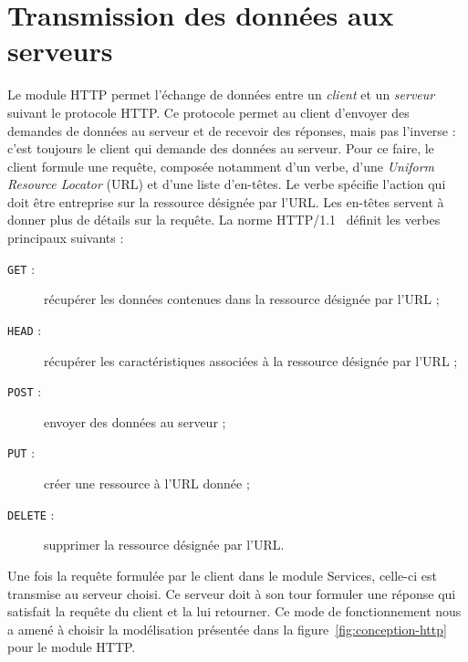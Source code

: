 \section{Transmission des données aux serveurs}

Le module HTTP permet l'échange de données entre un \emph{client} et un \emph{serveur} suivant le protocole HTTP. Ce protocole permet au client d'envoyer des demandes de données au serveur et de recevoir des réponses, mais pas l'inverse : c'est toujours le client qui demande des données au serveur. Pour ce faire, le client formule une requête, composée notamment d'un verbe, d'une \emph{Uniform Resource Locator} (URL) et d'une liste d'en-têtes. Le verbe spécifie l'action qui doit être entreprise sur la ressource désignée par l'URL. Les en-têtes servent à donner plus de détails sur la requête. La norme HTTP/1.1~\parencite{fielding1999} définit les verbes principaux suivants :

\begin{description}
    \item[\texttt{GET} :] récupérer les données contenues dans la ressource désignée par l'URL ;
    \item[\texttt{HEAD} :] récupérer les caractéristiques associées à la ressource désignée par l'URL ;
    \item[\texttt{POST} :] envoyer des données au serveur ;
    \item[\texttt{PUT} :] créer une ressource à l'URL donnée ;
    \item[\texttt{DELETE} :] supprimer la ressource désignée par l'URL.
\end{description}

Une fois la requête formulée par le client dans le module Services, celle-ci est transmise au serveur choisi. Ce serveur doit à son tour formuler une réponse qui satisfait la requête du client et la lui retourner. Ce mode de fonctionnement nous a amené à choisir la modélisation présentée dans la figure~\ref{fig:conception-http} pour le module HTTP.

